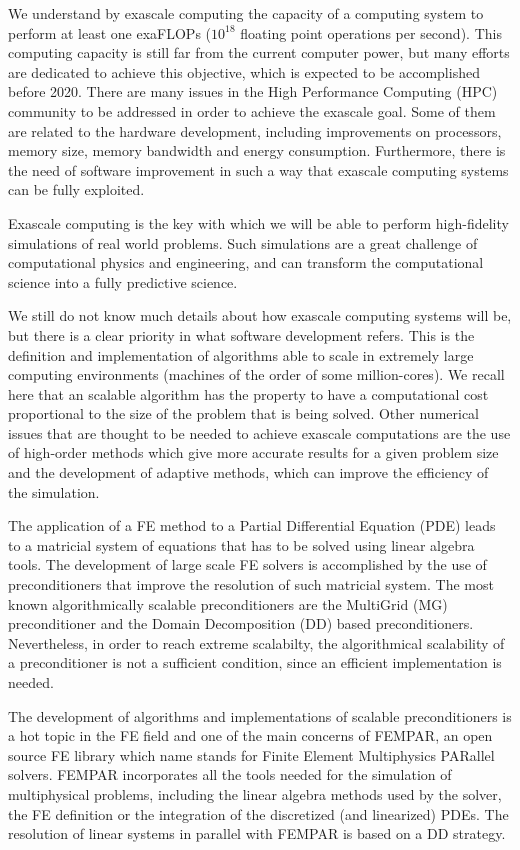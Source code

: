We understand by exascale computing the capacity of a computing system to perform at least one exaFLOPs ($ 10^{18} $ floating point operations per second). This computing capacity is still far from the current computer power, but many efforts are dedicated to achieve this objective, which is expected to be accomplished before 2020. There are many issues in the High Performance Computing (HPC) community to be addressed in order to achieve the exascale goal. Some of them are related to the hardware development, including improvements on processors, memory size, memory bandwidth and energy consumption. Furthermore, there is the need of software improvement in such a way that exascale computing systems can be fully exploited.

Exascale computing is the key with which we will be able to perform high-fidelity simulations of real world problems. Such simulations are a great challenge of computational physics and engineering, and can transform the computational science into a fully predictive science.

We still do not know much details about how exascale computing systems will be, but there is a clear priority in what software development refers. This is the definition and implementation of algorithms able to scale in extremely large computing environments (machines of the order of some million-cores). We recall here that an scalable algorithm has the property to have a computational cost proportional to the size of the problem that is being solved. Other numerical issues that are thought to be needed to achieve exascale computations are the use of high-order methods which give more accurate results for a given problem size and the development of adaptive methods, which can improve the efficiency of the simulation.

The application of a FE method to a Partial Differential Equation (PDE) leads to a matricial system of equations that has to be solved using linear algebra tools. The development of large scale FE solvers is accomplished by the use of preconditioners that improve the resolution of such matricial system. The most known algorithmically scalable preconditioners are the MultiGrid (MG) preconditioner and the Domain Decomposition (DD) based preconditioners. Nevertheless, in order to reach extreme scalabilty, the algorithmical scalability of a preconditioner is not a sufficient condition, since an efficient implementation is needed. 

The development of algorithms and implementations of scalable preconditioners is a hot topic in the FE field and one of the main concerns of FEMPAR, an open source FE library which name stands for Finite Element Multiphysics PARallel solvers. FEMPAR incorporates all the tools needed for the simulation of multiphysical problems, including the linear algebra methods used by the solver, the FE definition or the integration of the discretized (and linearized) PDEs. The resolution of linear systems in parallel with FEMPAR is based on a DD strategy.

